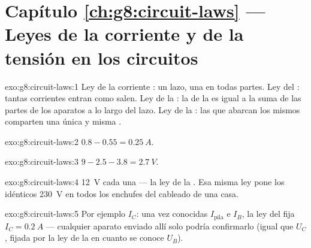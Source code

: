 \section*{Capítulo \ref{ch:g8:circuit-laws} --- Leyes de la corriente y de la tensión en los circuitos}

\begin{solution}{exo:g8:circuit-laws:1}
Ley de la corriente : un lazo, una  en todas
partes. Ley del : tantas corrientes entran como salen. Ley de
la  : la  de la
 es igual a la suma de las partes de los aparatos a lo largo
del lazo. Ley de la  : las  que
abarcan los mismos  comparten una única y misma
.
\end{solution}

\begin{solution}{exo:g8:circuit-laws:2}
$0.8 - 0.55 = \qty{0.25}{A}$.
\end{solution}

\begin{solution}{exo:g8:circuit-laws:3}
$9 - 2.5 - 3.8 = \qty{2.7}{V}$.
\end{solution}

\begin{solution}{exo:g8:circuit-laws:4}
\qty{12}{V} cada una --- la ley de la  . Esa
misma ley pone los idénticos \qty{230}{V} en todos los enchufes del
cableado  de una casa.
\end{solution}

\begin{solution}{exo:g8:circuit-laws:5}
Por ejemplo $I_C$: una vez conocidas $I_{\text{pila}}$ e $I_B$, la ley
del  fija $I_C = \qty{0.2}{A}$ --- cualquier aparato enviado
allí solo podría confirmarlo (igual que $U_C$, fijada por la ley de la
  en cuanto se conoce $U_B$).
\end{solution}

